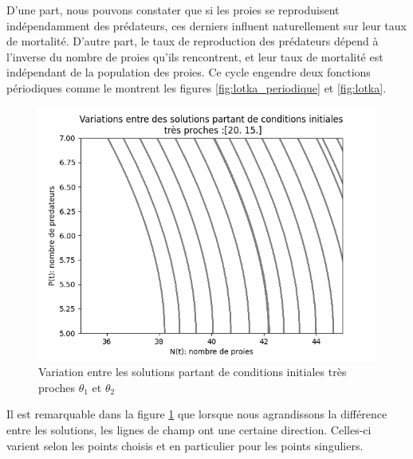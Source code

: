 \documentclass{article}
\begin{document}
D'une part, nous pouvons constater que si les proies se reproduisent indépendamment des prédateurs, ces derniers influent naturellement sur leur taux de mortalité. D'autre part, le taux de reproduction des prédateurs dépend à l'inverse du nombre de proies qu'ils rencontrent, et leur taux de mortalité est indépendant de la population des proies. Ce cycle engendre deux fonctions périodiques comme le montrent les figures \ref{fig:lotka_periodique} et \ref{fig:lotka}.
\begin{figure}[ht!]
    \centering
    \includegraphics[width=0.5\linewidth]{variations.png}
    \caption{ Variation entre les solutions partant de conditions initiales très proches $\theta_1$ et $\theta_2$}
    \label{fig:solutions}
\end{figure}


Il est remarquable dans la figure \ref{fig:solutions} que lorsque nous agrandissons la différence entre les solutions, les lignes de champ ont une certaine direction. Celles-ci varient selon les points choisis et en particulier pour les points singuliers.
\end{document}
